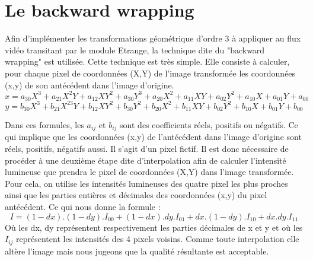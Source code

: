 \documentclass[a4paper,12pt]{report}
\begin{document}
\newpage

\section{Le backward wrapping}

{Afin d'implémenter les transformations géométrique d'ordre 3 à appliquer au flux vidéo transitant par le module Etrange, la technique dite du "backward wrapping" est utilisée. Cette technique est très simple. Elle consiste à calculer, pour chaque pixel de coordonnées (X,Y) de l'image transformée les coordonnées (x,y) de son antécédent dans l'image d'origine.
  \newline
  \newline
  $$
  x = a_{30}X^3 + a_{21}X^2Y + a_{12}XY^2 + a_{30}Y^3
  + a_{20}X^2 + a_{11}XY  + a_{02}Y^2
  + a_{10}X  + a_{01}Y
  + a_{00}
  $$
  $$
  y = b_{30}X^3 + b_{21}X^23Y + b_{12}XY^2 + b_{30}Y^2
  + b_{20}X^2 + b_{11}XY  + b_{02}Y^2
  + b_{10}X  + b_{01}Y
  + b_{00}
  $$

  {Dans ces formules, les $a_{ij}$ et $b_{ij}$ sont des coefficients réels, positifs ou négatifs. Ce qui implique que les coordonnées (x,y) de l'antécédent dans l'image d'origine sont réels, positifs, négatifs aussi. Il s'agit d'un pixel fictif.
    Il est donc nécessaire de procéder à une deuxième étape dite d'interpolation afin de calculer l'intensité lumineuse que prendra le pixel de coordonnées (X,Y) dans l'image transformée. Pour cela, on utilise les intensités lumineuses des quatre pixel les plus proches ainsi que les parties entières et décimales des coordonnées (x,y) du pixel antécédent. Ce qui nous donne la formule :
    \newline
    $$
    I = (1-dx).(1-dy).I_{00} + (1-dx).dy.I_{01} + dx.(1-dy).I_{10} + dx.dy.I_{11}
    $$
    \newline
    Où les dx, dy représentent respectivement les parties décimales de x et y et où les $I_{ij}$ représentent les intensités des 4 pixels voisins. Comme toute interpolation elle altère l'image mais nous jugeons que la qualité résultante est acceptable.
  }
}
\end{document}
